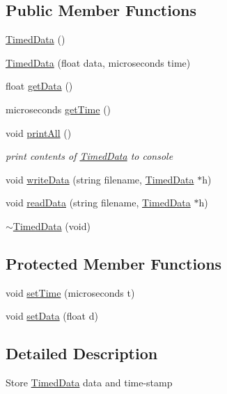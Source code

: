 \subsection*{Public Member Functions}
\begin{DoxyCompactItemize}
\item 
\hyperlink{classTimedData_abed3263e78c1a55e7ff5fe6a50185317}{Timed\+Data} ()
\item 
\hyperlink{classTimedData_a96f4b1aba52e95af687db6d71fa19bfa}{Timed\+Data} (float data, microseconds time)
\item 
float \hyperlink{classTimedData_aa8b1827a1b723de9ddd2582494927170}{get\+Data} ()
\item 
microseconds \hyperlink{classTimedData_a0012907b806867efc968db0d618213a6}{get\+Time} ()
\item 
\hypertarget{classTimedData_aaff93a393397a9dc1823652f8a0f89cc}{void \hyperlink{classTimedData_aaff93a393397a9dc1823652f8a0f89cc}{print\+All} ()}\label{classTimedData_aaff93a393397a9dc1823652f8a0f89cc}

\begin{DoxyCompactList}\small\item\em print contents of \hyperlink{classTimedData}{Timed\+Data} to console \end{DoxyCompactList}\item 
void \hyperlink{classTimedData_a6ae616a87f0f8ed004445b2fd6b1ba7d}{write\+Data} (string filename, \hyperlink{classTimedData}{Timed\+Data} $\ast$h)
\item 
void \hyperlink{classTimedData_a4b4ece4a2ab9c68e3fb0e2f1983819c5}{read\+Data} (string filename, \hyperlink{classTimedData}{Timed\+Data} $\ast$h)
\item 
\hyperlink{classTimedData_a9963efb752073782ab0cc4442cd41172}{$\sim$\+Timed\+Data} (void)
\end{DoxyCompactItemize}
\subsection*{Protected Member Functions}
\begin{DoxyCompactItemize}
\item 
void \hyperlink{classTimedData_a95d97c33cc4107ac10590aad5522f7a1}{set\+Time} (microseconds t)
\item 
void \hyperlink{classTimedData_aab7f26960dd570f86b8893352444411d}{set\+Data} (float d)
\end{DoxyCompactItemize}


\subsection{Detailed Description}
Store \hyperlink{classTimedData}{Timed\+Data} data and time-\/stamp 

